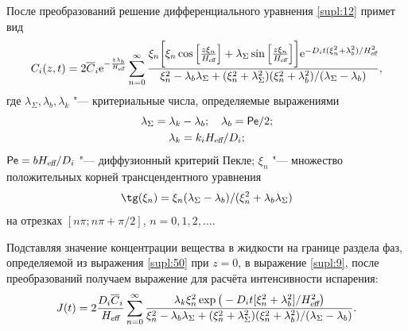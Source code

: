 После преобразований решение дифференциального уравнения \eqref{supl:12} примет вид
%
\begin{equation}%
\label{supl:50}
C_i(z,t)=2 \overline{C}_i \text{e}^{-\frac{z\lambda_b}{H_\text{\slshape eff}}}
\sum \limits_{n=0}^{\infty}
\frac{\xi_n
\bigg [\xi_n \cos  \Big[ \frac{z \xi_n} {H_\text{\slshape eff}} \Big]
+\lambda_\Sigma \sin\Big[ \frac{z \xi_n} {H_\text{\slshape eff}} \Big] \bigg] 
\text{e}^{-D_it (\xi_n^2+\lambda_b^2)/H_\text{\slshape eff}^2}}
{\xi_n^2-\lambda_b\lambda_\Sigma+(\xi_n^2+\lambda_\Sigma^2)(\xi_n^2+\lambda_b^2)/(\lambda_\Sigma-\lambda_b)},
\end{equation}
где $\lambda_\Sigma, \lambda_b, \lambda_k$ "--- критериальные числа, определяемые выражениями
\begin{gather}%
\label{supl:51}
\lambda_\Sigma=\lambda_k-\lambda_b;
\quad 
\lambda_b={\sf Pe}/2;%
\\%
\label{supl:53}
\lambda_k=k_i H_\text{\slshape eff}/D_i;
\end{gather}
${\sf Pe}=b H_\text{\slshape eff}/D_i$ "--- диффузионный критерий Пекле; $\xi_n$ "--- множество положительных корней трансцендентного уравнения 
\begin{equation}%
\label{supl:54}
 \tg(\xi_n)=\xi_n(\lambda_\Sigma-\lambda_b)/(\xi_n^2+\lambda_b\lambda_\Sigma)
\end{equation}
на отрезках $[n\pi; n\pi+\pi/2]$, $n=0, 1, 2, \dots$.

Подставляя значение концентрации вещества в жидкости на границе раздела фаз, определяемой из выражения \eqref{supl:50} при $z = 0$, в выражение \eqref{supl:9}, после преобразований получаем выражение для расчёта интенсивности испарения:
\begin{equation}%
\label{supl:55}
J(t)=2 \frac{D_i\overline{C}_i}{H_\text{\slshape eff}} 
\sum \limits_{n=0}^{\infty}
\frac{\lambda_k\xi_n^2
\exp \big(-D_it [\xi_n^2+\lambda_b^2]/H_\text{\slshape eff}^2 \big)}
{\xi_n^2-\lambda_b\lambda_\Sigma+(\xi_n^2+\lambda_\Sigma^2)(\xi_n^2+\lambda_b^2)/(\lambda_\Sigma-\lambda_b)}.
\end{equation}

